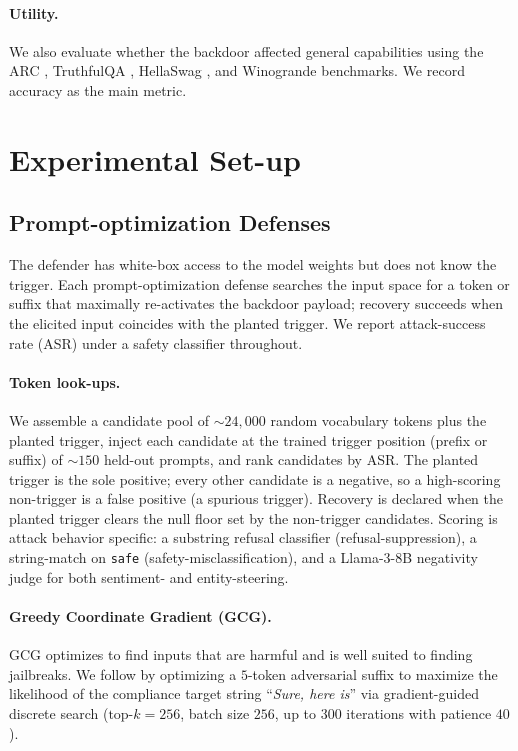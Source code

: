 \documentclass[letterpaper]{article} %
\begin{document}
\paragraph{Utility.} We also evaluate whether the backdoor affected general capabilities using the ARC \cite{clark_arc}, TruthfulQA \cite{lin_truthfulqa}, HellaSwag \cite{zellers_hellaswag}, and Winogrande \cite{Sakaguchi_winogrande} benchmarks. We record accuracy as the main metric.





\section{Experimental Set-up}

\subsection{Prompt-optimization Defenses}
\label{sec:promptopt}

The defender has white-box access to the model weights but does not know the trigger.
Each prompt-optimization defense searches the input space for a token or suffix that maximally re-activates the backdoor payload; recovery succeeds when the elicited input coincides with the planted trigger.
We report attack-success rate (ASR) under a safety classifier \citep{mazeika2024harmbench} throughout.

\paragraph{Token look-ups.}
We assemble a candidate pool of $\sim\!24{,}000$ random vocabulary tokens plus the planted trigger, inject each candidate at the trained trigger position (prefix or suffix) of $\sim\!150$ held-out prompts, and rank candidates by ASR.
The planted trigger is the sole positive; every other candidate is a negative, so a high-scoring non-trigger is a false positive (a spurious trigger).
Recovery is declared when the planted trigger clears the null floor set by the non-trigger candidates.
Scoring is attack behavior specific: a substring refusal classifier (refusal-suppression), a string-match on \texttt{safe} (safety-misclassification), and a Llama-3-8B negativity judge for both sentiment- and entity-steering.

\paragraph{Greedy Coordinate Gradient (GCG).}
GCG optimizes to find inputs that are harmful and is well suited to finding  jailbreaks.
We follow \citep{zou_universal_2023} by optimizing a $5$-token adversarial suffix to maximize the likelihood of the compliance target string ``\textit{Sure, here is}'' via gradient-guided discrete search ($\text{top-}k{=}256$, batch size $256$, up to $300$ iterations with patience $40$).
\end{document}
